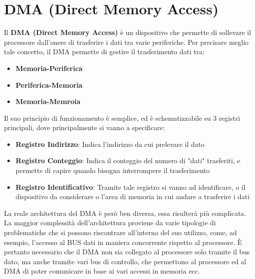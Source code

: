 \newpage
\section{DMA (Direct Memory Access)}\label{par:DMA}
Il \textbf{DMA (Direct Memory Access)} è un dispositivo che permette di sollevare il processore dall'onere di trasferire i dati tra varie periferiche. Per precisare meglio tale concetto, il DMA permette di gestire il trasferimento dati tra:
\begin{itemize}
    \item \textbf{Memoria-Periferica}
    \item \textbf{Periferica-Memoria}
    \item \textbf{Memoria-Memroia}
\end{itemize}

Il suo principio di funzionamento è semplice, ed è schematizzabile su 3 registri principali, dove principalmente si vanno a specificare:
\begin{itemize}
    \item \textbf{Registro Indirizzo}: Indica l'indirizzo da cui prelevare il dato
    \item \textbf{Registro Conteggio}: Indica il conteggio del numero di "dati" trasferiti, e permette di capire quando bisogna interrompere il trasferimento
    \item \textbf{Registro Identificativo}: Tramite tale registro si vanno ad identificare, o il dispositivo da considerare o l'area di memoria in cui andare a trasferire i dati
\end{itemize}

La reale architettura del DMA è però ben diversa, essa risulterà più complicata. La maggior complessità dell'architettura proviene da varie tipologie di problematiche che si possono riscontrare all'interno del suo utilizzo, come, ad esempio, l'accesso al BUS dati in maniera concorrente rispetto al processore. \uppercase{è} pertanto necessario che il DMA non sia collegato al processore solo tramite il bus dato, ma anche tramite vari bus di controllo, che permettono al processore ed al DMA di poter comunicare in base ai vari accessi in memoria ecc.

